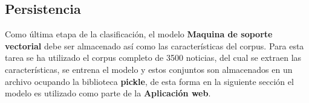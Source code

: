 \subsection{Persistencia}


Como última etapa de la clasificación, el modelo \textbf{Maquina de soporte vectorial} debe ser almacenado así como las características del corpus. Para esta tarea se ha utilizado el corpus completo de 3500 noticias, del cual se extraen las características, se entrena el modelo y estos conjuntos son almacenados en un archivo ocupando la biblioteca \textbf{pickle}, de esta forma en la siguiente sección el modelo es utilizado como parte de la \textbf{Aplicación web}.



